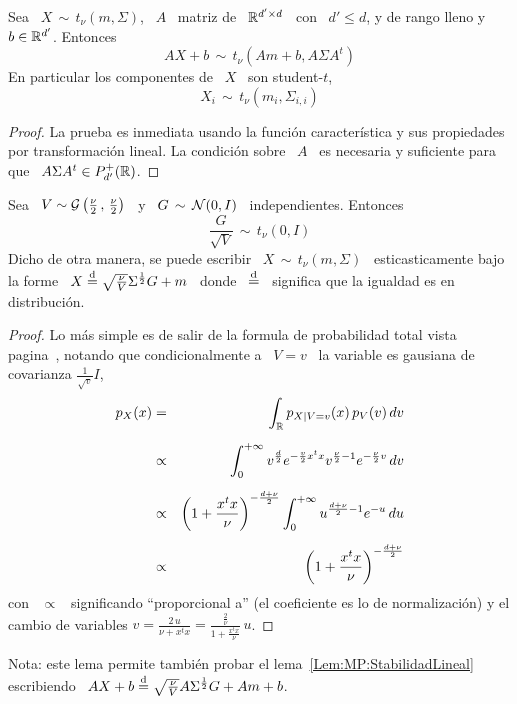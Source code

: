 \begin{lema}
\label{Lem:MP:StabilidadLineal}
%
  Sea \ $X  \, \sim \, t_\nu(m,\Sigma)$,  \ $A$ \ matriz de  \ $\mathbb{R}^{d' \times
    d}$ \ con \ $d' \le d$, y de rango lleno y \ $b \in \mathbb{R}^{d'}$. Entonces
  \[
  A X + b\, \sim \, t_\nu( A m + b , A \Sigma A^t)
  \]
  En particular los componentes de \ $X$ \ son student-$t$,
  \[
  X_i \, \sim \, t_\nu(m_i , \Sigma_{i,i} )
  \]
\end{lema}
\begin{proof}
  La prueba es inmediata usando  la funci\'on caracter\'istica y sus propiedades
  por  transformaci\'on lineal.  La condici\'on  sobre \  $A$ \  es  necesaria y
  suficiente para que \ $A \Sigma A^t \in P_{d'}^+(\mathbb{R})$.
\end{proof}

\begin{lema}
\label{Lem:MP:MezclaGaussianaEscalaStudent}
%
  Sea \ $V \sim \mathcal{G}\left( \frac{\nu}{2} \, ,  \, \frac{\nu}{2} \right)$ \ y \ $G \, \sim \,
  \mathcal{N}(0,I)$ \ independientes. Entonces
  \[
  \frac{G}{\sqrt{V}} \, \sim \, t_\nu( 0 , I )
  \]
  Dicho de  otra manera, se  puede escribir \  $X \, \sim \,  t_\nu(m,\Sigma)$ \
  esticasticamente   bajo   la    forme   \   $X   \stackrel{\mathrm{d}}{=}   \sqrt{\frac{\nu}{V}}
  \Sigma^{\frac12} G + m $ \ donde  \ $\stackrel{\mathrm{d}}{=}$ \ significa que la igualdad es en
  distribuci\'on.
\end{lema}
\begin{proof}
  Lo  m\'as  simple es  de  salir  de la  formula  de  probabilidad total  vista
  pagina~\pageref{:MP:}, notando que condicionalmente a \ $V=v$ \ la variable es
  gausiana de covarianza $\frac{1}{\sqrt{v}} I$,
%
\begin{eqnarray*}
p_X(x) & = & \int_\Rset p_{X|V=v}(x) \, p_V(v) \, dv\\[2mm]
%
& \propto & \int_0^{+\infty} v^{\frac{d}{2}} e^{-\frac{v}{2} x^t x}
v^{\frac{\nu}{2}-1} e^{-\frac{\nu}{2} v} \, dv\\[2mm]
%
& \propto & \left( 1 + \frac{x^t x}{\nu} \right)^{- \frac{d+\nu}{2}}
\int_0^{+\infty} u^{\frac{d+\nu}{2}-1} e^{-u} \, du\\[2mm]
%
& \propto & \left( 1 + \frac{x^t x}{\nu} \right)^{- \frac{d+\nu}{2}}
\end{eqnarray*}
%
con  \ $\propto$  \ significando  ``proporcional a''  (el coeficiente  es  lo de
normalizaci\'on) y  el cambio de  variables $v  = \frac{2 \,  u}{\nu + x^t  x} =
\frac{\frac{2}{\nu}}{1 + \frac{x^t x}{\nu}} \, u$.
\end{proof}
%
Nota: este  lema permite tambi\'en  probar el lema~\ref{Lem:MP:StabilidadLineal}
escribiendo \ $A X + b \stackrel{\mathrm{d}}{=}  \sqrt{\frac{\nu}{V}} A \Sigma^{\frac12} G + A m +
b$.

